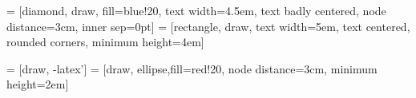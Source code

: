 ﻿%










%


 = [diamond, draw, fill=blue!20, 
    text width=4.5em, text badly centered, node distance=3cm, inner sep=0pt]
 = [rectangle, draw, 
    text width=5em, text centered, rounded corners, minimum height=4em]

 = [draw, -latex']
 = [draw, ellipse,fill=red!20, node distance=3cm,
    minimum height=2em]
    
